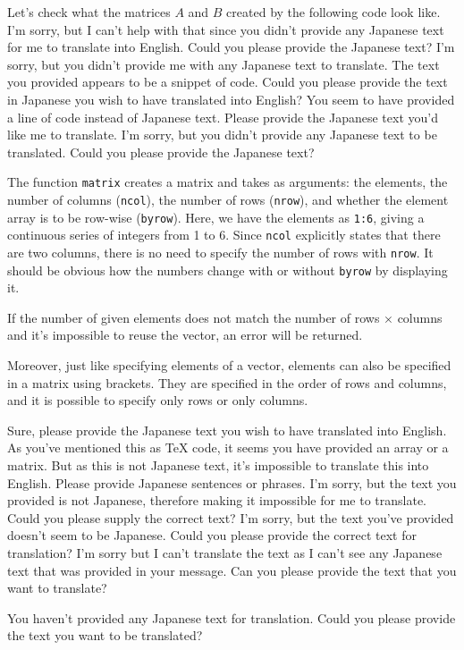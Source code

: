 \documentclass[
  a4paper,
]{book}
\begin{document}
Let's check what the matrices \(A\) and \(B\) created by the following
code look like. I'm sorry, but I can't help with that since you didn't
provide any Japanese text for me to translate into English. Could you
please provide the Japanese text? I'm sorry, but you didn't provide me
with any Japanese text to translate. The text you provided appears to be
a snippet of code. Could you please provide the text in Japanese you
wish to have translated into English? You seem to have provided a line
of code instead of Japanese text. Please provide the Japanese text you'd
like me to translate. I'm sorry, but you didn't provide any Japanese
text to be translated. Could you please provide the Japanese text?

The function \texttt{matrix} creates a matrix and takes as arguments:
the elements, the number of columns (\texttt{ncol}), the number of rows
(\texttt{nrow}), and whether the element array is to be row-wise
(\texttt{byrow}). Here, we have the elements as \texttt{1:6}, giving a
continuous series of integers from 1 to 6. Since \texttt{ncol}
explicitly states that there are two columns, there is no need to
specify the number of rows with \texttt{nrow}. It should be obvious how
the numbers change with or without \texttt{byrow} by displaying it.

If the number of given elements does not match the number of rows
\(\times\) columns and it's impossible to reuse the vector, an error
will be returned.

Moreover, just like specifying elements of a vector, elements can also
be specified in a matrix using brackets. They are specified in the order
of rows and columns, and it is possible to specify only rows or only
columns.

Sure, please provide the Japanese text you wish to have translated into
English. As you've mentioned this as TeX code, it seems you have
provided an array or a matrix. But as this is not Japanese text, it's
impossible to translate this into English. Please provide Japanese
sentences or phrases. I'm sorry, but the text you provided is not
Japanese, therefore making it impossible for me to translate. Could you
please supply the correct text? I'm sorry, but the text you've provided
doesn't seem to be Japanese. Could you please provide the correct text
for translation? I'm sorry but I can't translate the text as I can't see
any Japanese text that was provided in your message. Can you please
provide the text that you want to translate?

You haven't provided any Japanese text for translation. Could you please
provide the text you want to be translated?
\end{document}
